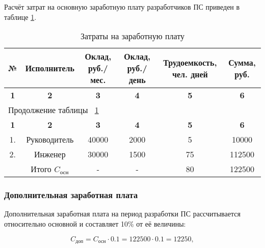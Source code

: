 Расчёт затрат на основную заработную плату разработчиков ПС приведен в таблице \ref{tab:eco_zarplata}.

\begin{center}
\begin{longtable}{|c|c|c|c|c|c|}
\caption{Затраты на заработную плату} \label{tab:eco_zarplata} \\ \hline
\multicolumn{1}{|c|}{\textbf{№}} & \multicolumn{1}{c|}{\textbf{Исполнитель}} & 
\multicolumn{1}{p{2.5cm}|}{\textbf{Оклад, руб./мес.}} &   \multicolumn{1}{p{2.5cm}|}{\textbf{Оклад, руб./день}} & 
\multicolumn{1}{p{3.5cm}|}{\textbf{Трудоемкость, чел. дней}} & \multicolumn{1}{p{2cm}|}{\textbf{Сумма, руб.}} \\ \hline

\multicolumn{1}{|c|}{\textbf{1}} &   \multicolumn{1}{c|}{\textbf{2}} & 
\multicolumn{1}{c|}{\textbf{3}} &   \multicolumn{1}{c|}{\textbf{4}} & 
\multicolumn{1}{c|}{\textbf{5}} & \multicolumn{1}{c|}{\textbf{6}} \\ \hline
\endfirsthead

\multicolumn{6}{|l|}{{Продолжение таблицы ~\ref{tab:eco_zarplata}}} \\ %
\hline
\multicolumn{1}{|c|}{\textbf{1}} &   \multicolumn{1}{c|}{\textbf{2}} & 
\multicolumn{1}{c|}{\textbf{3}} &   \multicolumn{1}{c|}{\textbf{4}} & 
\multicolumn{1}{c|}{\textbf{5}} & \multicolumn{1}{c|}{\textbf{6}} \\ \hline
\endhead

\endfoot

\hline
\endlastfoot

1. & Руководитель & 40000 & 2000 & 5 & 10000 \\ \hline
2. & Инженер & 30000 & 1500 & 75 & 112500 \\ \hline
 & Итого ${C_{\mbox{осн}}}$ & - & - & 80 & 122500 \\

\hline

\end{longtable}
\end{center}

\subsubsection*{Дополнительная заработная плата}
Дополнительная заработная плата на период разработки ПС рассчитывается относительно основной и составляет 10\% от её величины:

\begin{equation}
C_{\mbox{доп}} = C_{\mbox{осн}} \cdot 0.1 = 122500 \cdot 0.1 = 12250,
\end{equation}

